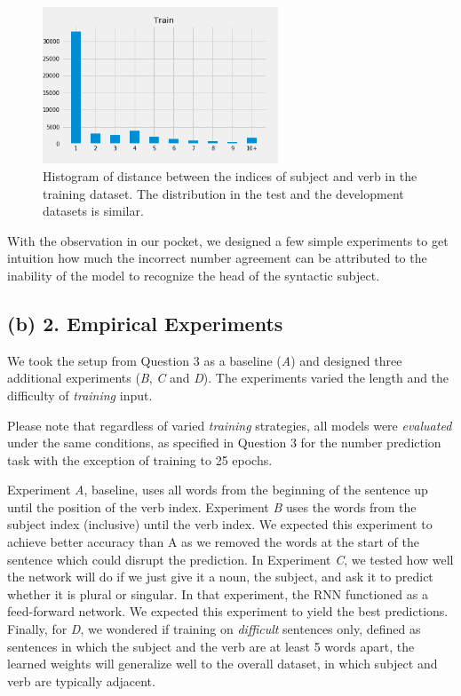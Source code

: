 \documentclass{article}
\begin{document}
\begin{figure}[h]
\centering
\includegraphics[width=7cm]{figures/train.png} 
\caption{Histogram of distance between the indices of subject and verb in the training dataset. The distribution in the test and the development datasets is similar.}
\end{figure}

With the observation in our pocket, we designed a few simple experiments to get intuition how much the incorrect number agreement can be attributed to the inability of the model to recognize the head of the syntactic subject.

\subsection*{(b) 2. Empirical Experiments} We took the setup from Question 3 as a baseline (\textit{A}) and designed three additional experiments (\textit{B}, \textit{C} and \textit{D}). The experiments varied the length and the difficulty of \textit{training} input. 

Please note that regardless of varied \textit{training} strategies, all models were \textit{evaluated} under the same conditions, as specified in Question 3 for the number prediction task with the exception of training to 25 epochs.

Experiment \textit{A}, baseline, uses all words from the beginning of the sentence up until the position of the verb index. Experiment \textit{B} uses the words from the subject index (inclusive) until the verb index. We expected this experiment to achieve better accuracy than A as we removed the words at the start of the sentence which could disrupt the prediction. In Experiment \textit{C}, we tested how well the network will do if we just give it a noun, the subject, and ask it to predict whether it is plural or singular. In that experiment, the RNN functioned as a feed-forward network. We expected this experiment to yield the best predictions. Finally, for \textit{D}, we wondered if training on \textit{difficult} sentences only, defined as sentences in which the subject and the verb are at least 5 words apart, the learned weights will generalize well to the overall dataset, in which subject and verb are typically adjacent.
\end{document}

